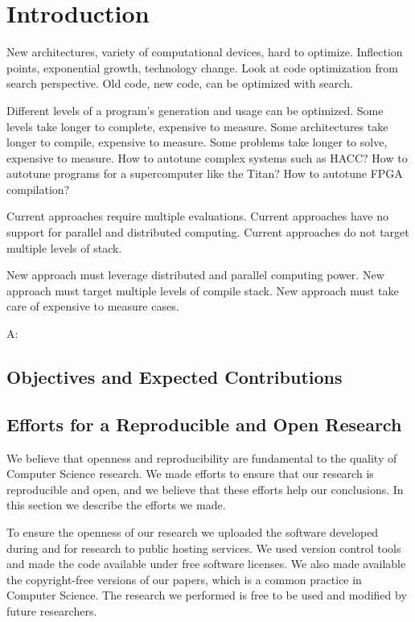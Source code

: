 \chapter{Introduction}
\label{chap:introduction}

New architectures, variety of computational devices, hard to optimize.
Inflection points, exponential growth, technology change.
Look at code optimization from search perspective.
Old code, new code, can be optimized with search.

Different levels of a program's generation and usage can be optimized.
Some levels take longer to complete, expensive to measure.
Some architectures take longer to compile, expensive to measure.
Some problems take longer to solve, expensive to measure.
How to autotune complex systems such as HACC?
How to autotune programs for a supercomputer like the Titan?
How to autotune FPGA compilation?

Current approaches require multiple evaluations.
Current approaches have no support for parallel and distributed computing.
Current approaches do not target multiple levels of stack.

New approach must leverage distributed and parallel computing power.
New approach must target multiple levels of compile stack.
New approach must take care of expensive to measure cases.

A: \citet{bilmes1997optimizing}

\section{Objectives and Expected Contributions}
\label{sec:contributions}

\section{Efforts for a Reproducible and Open Research}

We believe that openness and reproducibility are fundamental to the quality of
Computer Science research. We made efforts to ensure that our research is
reproducible and open, and we believe that these efforts help our conclusions.
In this section we describe the efforts we made.

To ensure the openness of our research we uploaded the software developed
during and for research to public hosting services. We used version control
tools and made the code available under free software licenses. We also
made available the copyright-free versions of our papers, which is a common
practice in Computer Science. The research we performed is free to be used and
modified by future researchers.

